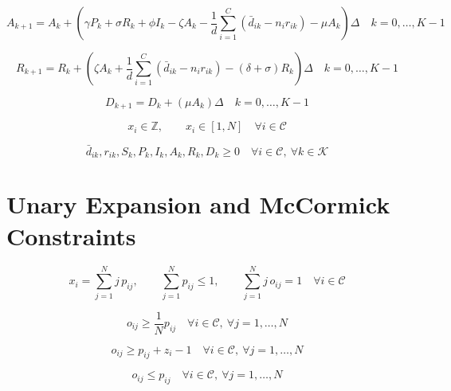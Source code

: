 \documentclass{article}
\begin{document}
\begin{equation}
A_{k+1} = A_k + \left(
\gamma P_k + \sigma R_k + \phi I_k - \zeta A_k
- \frac{1}{d}\sum_{i=1}^{C}\left(\bar d_{ik} - n_i r_{ik}\right)
- \mu A_k
\right)\Delta
\quad k=0,\dots,K-1
\tag{28j}
\end{equation}

\begin{equation}
R_{k+1} = R_k + \left(
\zeta A_k + \frac{1}{d}\sum_{i=1}^{C}\left(\bar d_{ik} - n_i r_{ik}\right)
- (\delta+\sigma)R_k
\right)\Delta
\quad k=0,\dots,K-1
\tag{28k}
\end{equation}

\begin{equation}
D_{k+1} = D_k + (\mu A_k)\Delta
\quad k=0,\dots,K-1
\tag{28l}
\end{equation}

\begin{equation}
x_i \in \mathbb Z,\qquad x_i \in [1,N]
\quad \forall i \in \mathcal C
\tag{28m}
\end{equation}

\begin{equation}
\bar d_{ik},r_{ik},S_k,P_k,I_k,A_k,R_k,D_k \ge 0
\quad \forall i \in \mathcal C,\ \forall k \in \mathcal K
\tag{28n}
\end{equation}

\section*{Unary Expansion and McCormick Constraints}
\begin{equation}
x_i = \sum_{j=1}^{N} j\,p_{ij},\qquad
\sum_{j=1}^{N} p_{ij} \le 1,\qquad
\sum_{j=1}^{N} j\,o_{ij} = 1
\quad \forall i \in \mathcal C
\tag{29a}
\end{equation}

\begin{equation}
o_{ij} \ge \frac{1}{N}p_{ij}
\quad \forall i \in \mathcal C,\ \forall j=1,\dots,N
\tag{29b}
\end{equation}

\begin{equation}
o_{ij} \ge p_{ij} + z_i - 1
\quad \forall i \in \mathcal C,\ \forall j=1,\dots,N
\tag{29c}
\end{equation}

\begin{equation}
o_{ij} \le p_{ij}
\quad \forall i \in \mathcal C,\ \forall j=1,\dots,N
\tag{29d}
\end{equation}
\end{document}
